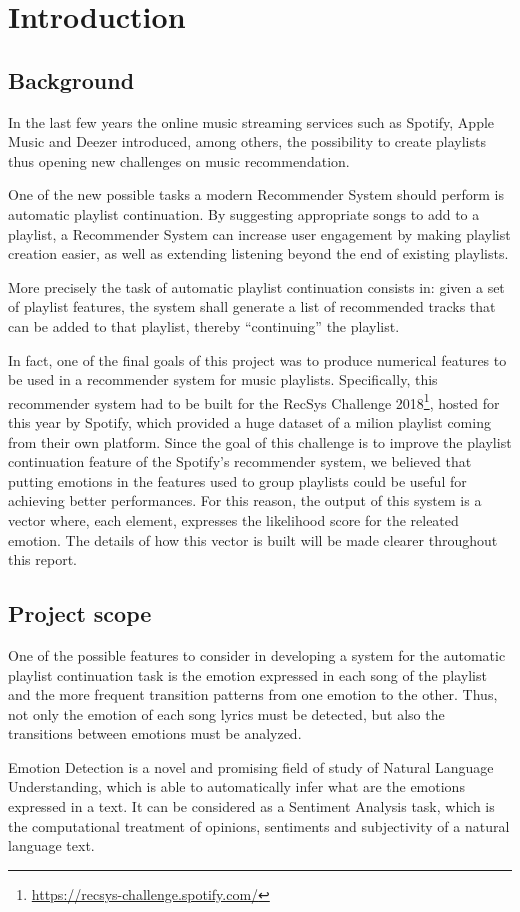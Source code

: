 \chapter{Introduction}
\section{Background}
In the last few years the online music streaming services such as Spotify, Apple Music and Deezer introduced, among others,  the possibility to create playlists thus opening new challenges on music recommendation.\par
One of the new possible tasks a modern Recommender System should perform is automatic playlist continuation. By suggesting appropriate songs to add to a playlist, a Recommender System can increase user engagement by making playlist creation easier, as well as extending listening beyond the end of existing playlists. \par
More precisely the task of automatic playlist continuation consists in: given a set of playlist features, the system shall generate a list of recommended tracks that can be added to that playlist, thereby ``continuing'' the playlist. \par

In fact, one of the final goals of this project was to produce numerical features to be used in a recommender system for music playlists. Specifically, this recommender system had to be built for the RecSys Challenge 2018\footnote{\url{https://recsys-challenge.spotify.com/}}, hosted for this year by Spotify, which provided a huge dataset of a milion playlist coming from their own platform. Since the goal of this challenge is to improve the playlist continuation feature of the Spotify's recommender system, we believed that putting emotions in the features used to group playlists could be useful for achieving better performances. For this reason, the output of this system is a vector where, each element, expresses the likelihood score for the releated emotion. The details of how this vector is built will be made clearer throughout this report.

\section{Project scope}

One of the possible features to consider in developing a system for the automatic playlist continuation task is the emotion expressed in each song of the playlist and the more frequent transition patterns from one emotion to the other. Thus, not only the emotion of each song lyrics must be detected, but also the transitions between emotions must be analyzed. \par
Emotion Detection is a novel and promising field of study of Natural Language Understanding, which is able to automatically infer what are the emotions expressed in a text. It can be considered as a Sentiment Analysis task, which is the computational treatment of opinions, sentiments and subjectivity of a natural language text. \par

